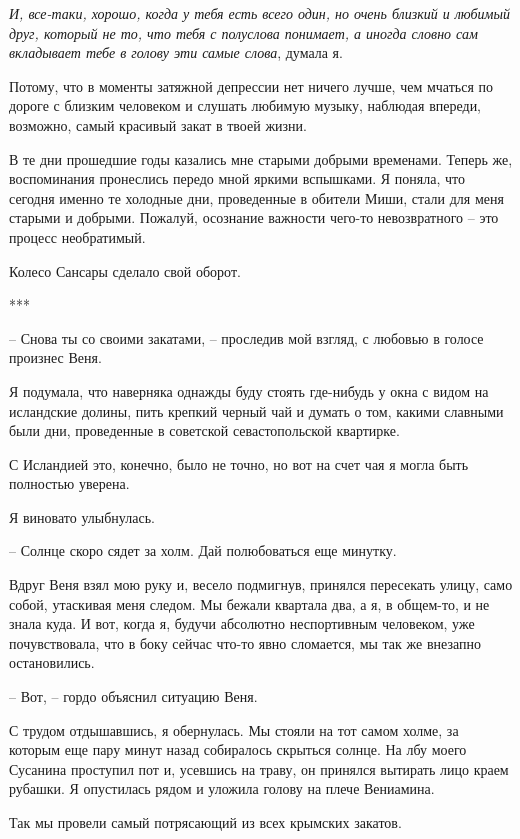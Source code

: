 \documentclass[
]{book}
\begin{document}
\emph{И, все-таки, хорошо, когда у тебя есть всего один, но очень близкий и любимый друг, который не то, что тебя с полуслова понимает, а иногда словно сам вкладывает тебе в голову эти самые слова}, думала я.

Потому, что в моменты затяжной депрессии нет ничего лучше, чем мчаться по дороге с близким человеком и слушать любимую музыку, наблюдая впереди, возможно, самый красивый закат в твоей жизни.

В те дни прошедшие годы казались мне старыми добрыми временами. Теперь же, воспоминания пронеслись передо мной яркими вспышками. Я поняла, что сегодня именно те холодные дни, проведенные в обители Миши, стали для меня старыми и добрыми. Пожалуй, осознание важности чего-то невозвратного -- это процесс необратимый.

Колесо Сансары сделало свой оборот.

***

-- Снова ты со своими закатами, -- проследив мой взгляд, с любовью в голосе произнес Веня.

Я подумала, что наверняка однажды буду стоять где-нибудь у окна с видом на исландские долины, пить крепкий черный чай и думать о том, какими славными были дни, проведенные в советской севастопольской квартирке.

С Исландией это, конечно, было не точно, но вот на счет чая я могла быть полностью уверена.

Я виновато улыбнулась.

-- Солнце скоро сядет за холм. Дай полюбоваться еще минутку.

Вдруг Веня взял мою руку и, весело подмигнув, принялся пересекать улицу, само собой, утаскивая меня следом. Мы бежали квартала два, а я, в общем-то, и не знала куда. И вот, когда я, будучи абсолютно неспортивным человеком, уже почувствовала, что в боку сейчас что-то явно сломается, мы так же внезапно остановились.

-- Вот, -- гордо объяснил ситуацию Веня.

С трудом отдышавшись, я обернулась. Мы стояли на тот самом холме, за которым еще пару минут назад собиралось скрыться солнце. На лбу моего Сусанина проступил пот и, усевшись на траву, он принялся вытирать лицо краем рубашки. Я опустилась рядом и уложила голову на плече Вениамина.

Так мы провели самый потрясающий из всех крымских закатов.

\hypertarget{chapter-29}{%
\chapter{~}\label{chapter-29}}
\end{document}
